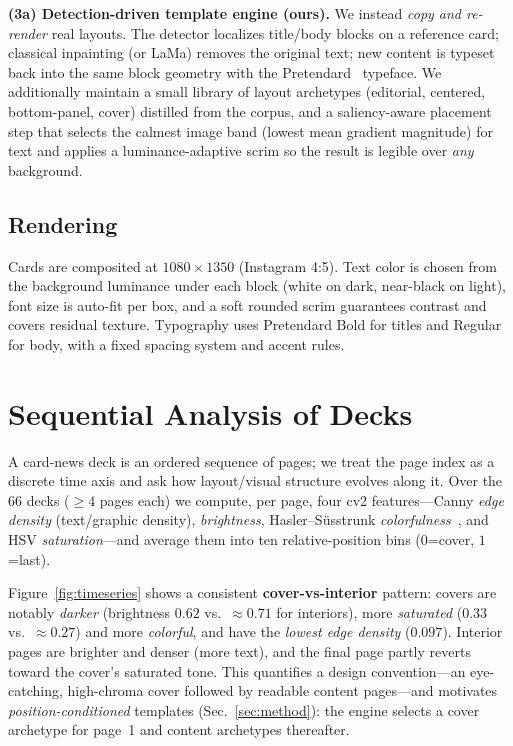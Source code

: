 \documentclass[10pt,twocolumn,letterpaper]{article}
\begin{document}
\textbf{(3a) Detection-driven template engine (ours).} We instead \emph{copy and
re-render} real layouts. The detector localizes title/body blocks on a reference
card; classical inpainting (or LaMa) removes the original text; new content is
typeset back into the same block geometry with the Pretendard~\cite{pretendard}
typeface. We additionally maintain a small library of layout archetypes
(editorial, centered, bottom-panel, cover) distilled from the corpus, and a
saliency-aware placement step that selects the calmest image band (lowest mean
gradient magnitude) for text and applies a luminance-adaptive scrim so the result
is legible over \emph{any} background.

\subsection{Rendering}
Cards are composited at $1080\times1350$ (Instagram 4:5). Text color is chosen
from the background luminance under each block (white on dark, near-black on
light), font size is auto-fit per box, and a soft rounded scrim guarantees
contrast and covers residual texture. Typography uses Pretendard Bold for titles
and Regular for body, with a fixed spacing system and accent rules.

\section{Sequential Analysis of Decks}
\label{sec:timeseries}
A card-news deck is an ordered sequence of pages; we treat the page index as a
discrete time axis and ask how layout/visual structure evolves along it. Over the
66 decks ($\geq 4$ pages each) we compute, per page, four cv2 features---Canny
\emph{edge density} (text/graphic density), \emph{brightness}, Hasler--S\"usstrunk
\emph{colorfulness}~\cite{hasler2003colorfulness}, and HSV \emph{saturation}---and
average them into ten relative-position bins ($0$=cover, $1$=last).

Figure~\ref{fig:timeseries} shows a consistent \textbf{cover-vs-interior}
pattern: covers are notably \emph{darker} (brightness $0.62$ vs.\ $\approx0.71$
for interiors), more \emph{saturated} ($0.33$ vs.\ $\approx0.27$) and more
\emph{colorful}, and have the \emph{lowest edge density} ($0.097$). Interior pages
are brighter and denser (more text), and the final page partly reverts toward the
cover's saturated tone. This quantifies a design convention---an eye-catching,
high-chroma cover followed by readable content pages---and motivates
\emph{position-conditioned} templates (Sec.~\ref{sec:method}): the engine selects
a cover archetype for page~1 and content archetypes thereafter.
\end{document}
